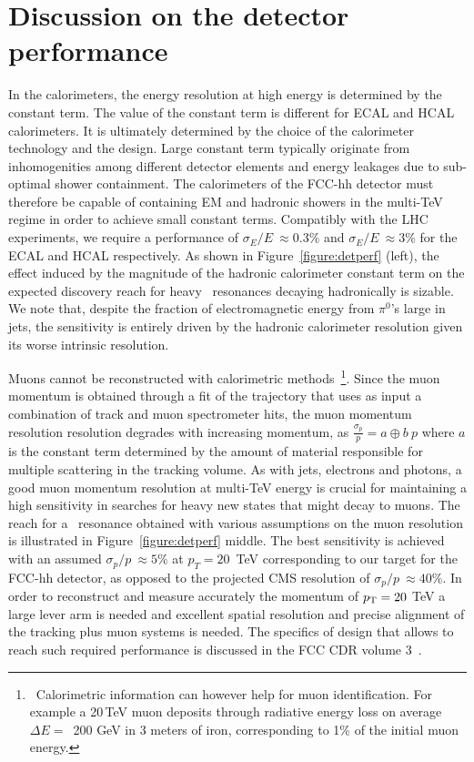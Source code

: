 \section{Discussion on the detector performance}
\label{sec:detperf}

In the calorimeters, the energy resolution at high energy is determined by the constant term. The value of the constant term is different for ECAL and HCAL calorimeters. It is ultimately determined by the choice of the calorimeter technology and the design. Large constant term typically originate from inhomogenities among different detector elements and energy leakages due to sub-optimal shower containment. The calorimeters of the FCC-hh detector must therefore be capable of containing EM and hadronic showers in the multi-TeV regime in order to achieve small constant terms.
Compatibly with the LHC experiments, we require a performance of $\sigma_E/E~ \approx 0.3 \%$ and $\sigma_E/E~ \approx 3\%$ for the ECAL and HCAL respectively. As shown in Figure~\ref{figure:detperf} (left), the effect induced by the magnitude of the hadronic calorimeter constant term on the expected discovery reach for heavy \ZpSSM\ resonances decaying hadronically is sizable. We note that, despite the fraction of electromagnetic energy from $\pi^0$'s large in jets, the sensitivity is entirely driven by the hadronic calorimeter resolution given its worse intrinsic resolution.

Muons cannot be reconstructed with calorimetric methods~\footnote{~Calorimetric information can however help for muon identification. For example a 20\,TeV muon deposits through radiative energy loss on average $\Delta E=$~200 GeV in 3 meters of iron, corresponding to 1\% of the initial muon energy.}. Since the muon momentum is obtained through a fit of the trajectory that uses as input a combination of track and muon spectrometer hits, the muon momentum resolution resolution degrades with increasing momentum, as $\frac{\sigma_p}{p}= a \oplus b~p$ where $a$ is the constant term determined by the amount of material responsible for multiple scattering in the tracking volume. As with jets, electrons and photons, a good muon momentum resolution at multi-TeV energy is crucial for maintaining a high sensitivity in searches for heavy new states that might decay to muons. The reach for a \Zpmumu\ resonance obtained with various assumptions on the muon resolution is illustrated in Figure~\ref{figure:detperf} middle. The best sensitivity is achieved with an assumed $\sigma_p/p~ \approx 5\%$ at $p_T = 20$~TeV corresponding to our target for the FCC-hh detector, as opposed to the projected CMS resolution of $\sigma_p/p~\approx 40\%$. In order to reconstruct and measure accurately the momentum of $p_{\text{T}}=20~$TeV a large lever arm is needed and excellent spatial resolution and precise alignment of the tracking plus muon systems is needed. The specifics of design that allows to reach such required performance is discussed in the FCC CDR volume 3~\cite{cdr_volume3}.

